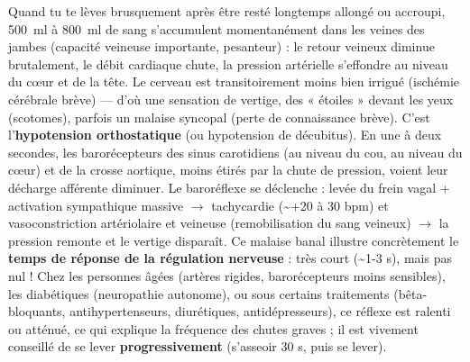 \documentclass[11pt]{article}
\begin{document}
\begin{savaistu}
Quand tu te lèves brusquement après être resté longtemps allongé ou accroupi, \SI{500}{ml} à \SI{800}{ml} de sang s'accumulent momentanément dans les veines des jambes (capacité veineuse importante, pesanteur) : le retour veineux diminue brutalement, le débit cardiaque chute, la pression artérielle s'effondre au niveau du cœur et de la tête. Le cerveau est transitoirement moins bien irrigué (ischémie cérébrale brève) — d'où une sensation de vertige, des « étoiles » devant les yeux (scotomes), parfois un malaise syncopal (perte de connaissance brève). C'est l'\textbf{hypotension orthostatique} (ou hypotension de décubitus).
En une à deux secondes, les barorécepteurs des sinus carotidiens (au niveau du cou, au niveau du cœur) et de la crosse aortique, moins étirés par la chute de pression, voient leur décharge afférente diminuer. Le baroréflexe se déclenche : levée du frein vagal + activation sympathique massive $\rightarrow$ tachycardie (\textasciitilde +20 à 30 bpm) et vasoconstriction artériolaire et veineuse (remobilisation du sang veineux) $\rightarrow$ la pression remonte et le vertige disparaît.
Ce malaise banal illustre concrètement le \textbf{temps de réponse de la régulation nerveuse} : très court (\textasciitilde 1-3 s), mais pas nul ! Chez les personnes âgées (artères rigides, barorécepteurs moins sensibles), les diabétiques (neuropathie autonome), ou sous certains traitements (bêta-bloquants, antihypertenseurs, diurétiques, antidépresseurs), ce réflexe est ralenti ou atténué, ce qui explique la fréquence des chutes graves ; il est vivement conseillé de se lever \textbf{progressivement} (s'asseoir 30 s, puis se lever).
\end{savaistu}
\end{document}
